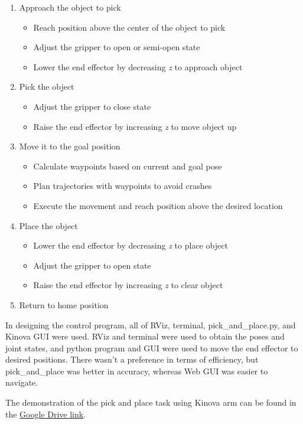 \documentclass[12pt]{article}
\begin{document}
\begin{enumerate}
    \item Approach the object to pick
    \begin{itemize}
        \item Reach position above the center of the object to pick
        \item Adjust the gripper to open or semi-open state
        \item Lower the end effector by decreasing \textit{z} to approach object
    \end{itemize}
    \item Pick the object
    \begin{itemize}
        \item Adjust the gripper to close state
        \item Raise the end effector by increasing \textit{z} to move object up
    \end{itemize}
    \item Move it to the goal position
    \begin{itemize}
        \item Calculate waypoints based on current and goal pose
        \item Plan trajectories with waypoints to avoid crashes
        \item Execute the movement and reach position above the desired location
    \end{itemize}
    \item Place the object
    \begin{itemize}
        \item Lower the end effector by decreasing \textit{z} to place object
        \item Adjust the gripper to open state
        \item Raise the end effector by increasing \textit{z} to clear object
    \end{itemize}
    \item Return to home position
\end{enumerate}

In designing the control program, all of RViz, terminal, pick\_and\_place.py, and Kinova GUI were used. RViz and terminal were used to obtain the poses and joint states, and python program and GUI were used to move the end effector to desired positions. There wasn't a preference in terms of efficiency, but pick\_and\_place was better in accuracy, whereas Web GUI was easier to navigate.

The demonstration of the pick and place task using Kinova arm can be found in the \href{https://drive.google.com/file/d/1E0ccf-PJmG3pVAfF3og_iQfPEocuBK_P/view?usp=share_link}{Google Drive link}.
\end{document}
